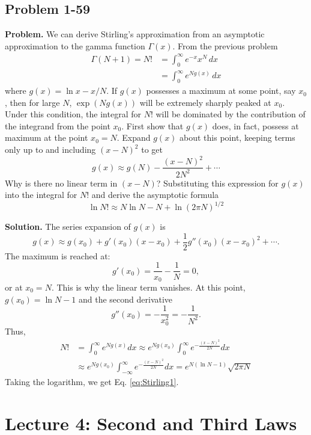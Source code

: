 \documentclass[twocolumn, 10pt]{article}
\numberwithin{equation}{section}
\newenvironment{problem}
{\par\medskip\sffamily \color{problue}
  \textbf{Problem. }\ignorespaces}
{\medskip}
\newenvironment{solution}
{\par\medskip
  \textbf{Solution. }\ignorespaces}
{\medskip}
\begin{document}
\subsection{Problem 1-59}

\begin{problem}
We can derive Stirling's approximation from
an asymptotic approximation to the gamma function $\Gamma(x)$.
From the previous problem
\begin{align*}
  \Gamma(N+1) = N!
  &= \int_0^\infty e^{-x} x^N \, dx
  \\
  &= \int_0^\infty e^{N g(x)} \, dx
\end{align*}
where $g(x) = \ln x - x/N$.
%
If $g(x)$ possesses a maximum at some point, say $x_0$,
then for large $N$, $\exp(N g(x))$ will be extremely
sharply peaked at $x_0$.
%
Under this condition, the integral for $N!$
will be dominated by the contribution of the integrand
from the point $x_0$.
%
First show that $g(x)$ does, in fact,
possess at maximum at the point $x_0 = N$.
%
Expand $g(x)$ about this point,
keeping terms only up to and including
$(x-N)^2$ to get
$$
g(x) \approx g(N) - \frac{ (x - N)^2 } { 2 N^2 } + \cdots
$$
Why is there no linear term in $(x-N)$?
Substituting this expression for $g(x)$
into the integral for $N!$ and derive the asymptotic formula
\begin{equation}
  \ln N! \approx N \ln N - N + \ln (2\pi N)^{1/2}
  \label{eq:Stirling1}
\end{equation}
\end{problem}

\begin{solution}
The series expansion of $g(x)$ is
$$
  g(x) \approx g(x_0)
  + g'(x_0) (x - x_0)
  + \frac{1}{2} g''(x_0) (x - x_0)^2
  + \cdots.
$$
The maximum is reached at:
$$
  g'(x_0) = \frac{1}{x_0} - \frac{1}{N} = 0,
$$
or at $x_0 = N$.
This is why the linear term vanishes.
%
At this point, $g(x_0) = \ln N - 1$
and the second derivative
$$
  g''(x_0) = -\frac{1}{x_0^2} = -\frac{1}{N^2}.
$$
%
Thus,
\begin{align*}
  N!
  &= \int_0^\infty e^{Ng(x)} dx
  \approx
  e^{Ng(x_0)}
  \int_0^\infty
  e^{- \frac{(x-N)^2}{2N} } dx
  \\
  &\approx
  e^{Ng(x_0)}
  \int_{-\infty}^\infty
  e^{- \frac{(x-N)^2}{2N} } dx
  =
  e^{N(\ln N - 1)} \sqrt{2\pi N}
\end{align*}
%
Taking the logarithm, we get Eq. \eqref{eq:Stirling1}.
\end{solution}

\section{Lecture 4: Second and Third Laws}
\end{document}
